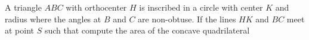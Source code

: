 A triangle $ABC$ with orthocenter $H$ is inscribed in a circle with center $K$ and radius  where the angles at $B$ and $C$ are non-obtuse. If the lines $HK$ and $BC$ meet at point $S$ such that  compute the area of the concave quadrilateral 